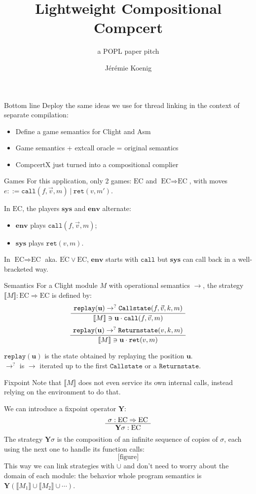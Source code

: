 \documentclass[handout]{beamer}
\title{Lightweight Compositional Compcert}
\subtitle{a POPL paper pitch}
\author{J\'er\'emie Koenig}
\newcommand{\EC}{\text{EC}}
\newcommand{\nEC}{\overline{\EC}}
\newcommand{\ECEC}{\EC \Rightarrow \EC}
\newcommand{\kw}[1]{\texttt{#1}}
\newcommand{\word}[1]{\mathbf{#1}}
\newcommand{\sys}{\textbf{sys}}
\newcommand{\env}{\textbf{env}}
\newcommand{\Y}{\mathbf{Y}}
\begin{document}
\begin{frame}
\titlepage
\end{frame}

\begin{frame}{Bottom line} %
Deploy the same ideas we use for thread linking
in the context of separate compilation:
\begin{itemize}
\item Define a game semantics for Clight and Asm
\item Game semantics + extcall oracle = original semantics
\item CompcertX just turned into a compositional complier
\end{itemize}
\end{frame}

\begin{frame}{Games} %
For this application, only 2 games: $\EC$ and $\ECEC$,
with moves
$e ::= \kw{call}(f, \vec{v}, m) \ \vert\ \kw{ret}(v, m')$.

In $\EC$, the players $\sys$ and $\env$ alternate:
\begin{itemize}
\item $\env$ plays $\kw{call}(f, \vec{v}, m)$;
\item $\sys$ plays $\kw{ret}(v, m)$.
\end{itemize}

In $\ECEC$ aka. $\nEC \vee \EC$,
$\env$ starts with $\kw{call}$ but
$\sys$ can call back in a well-bracketed way.
\end{frame}

\begin{frame}{Semantics} %
For a Clight module $M$ with operational semantics $\rightarrow$,
the strategy $\llbracket M \rrbracket : \ECEC$ is defined by:
\[
	\AxiomC{$\kw{replay}(\word{u})
		\rightarrow^?
		\kw{Callstate}(f, \vec{v}, k, m)$}
	\UnaryInfC{$\llbracket M \rrbracket \ni
		\word{u} \cdot \kw{call}(f, \vec{v}, m)$}
	\DisplayProof
\]
\[
	\AxiomC{$\kw{replay}(\word{u})
		\rightarrow^?
		\kw{Returnstate}(v, k, m)$}
	\UnaryInfC{$\llbracket M \rrbracket \ni
		\word{u} \cdot \kw{ret}(v, m)$}
	\DisplayProof
\]

$\kw{replay}(\word{u})$ is the state obtained
by replaying the position $\word{u}$. \\
$\rightarrow^{?}$ is $\rightarrow$ iterated
up to the first $\kw{Callstate}$ or a $\kw{Returnstate}$.
\end{frame}

\begin{frame}{Fixpoint} %
Note that $\llbracket M \rrbracket$
does not even service its own internal calls,
instead relying on the environment to do that.

We can introduce a fixpoint operator $\Y$:
\[
	\AxiomC{$\sigma : \ECEC$}
	\UnaryInfC{$\Y \sigma : \EC$}
	\DisplayProof
\]
The strategy $\Y \sigma$ is the composition
of an infinite sequence of copies of $\sigma$,
each using the next one to handle its function calls:
\[ \text{[figure]} \]
This way we can link strategies with $\cup$
and don't need to worry about the domain of each module:
the behavior whole program semantics is $\Y ( \llbracket M_1 \rrbracket \cup \llbracket M_2 \rrbracket \cup \cdots )$.
\end{frame}
\end{document}
